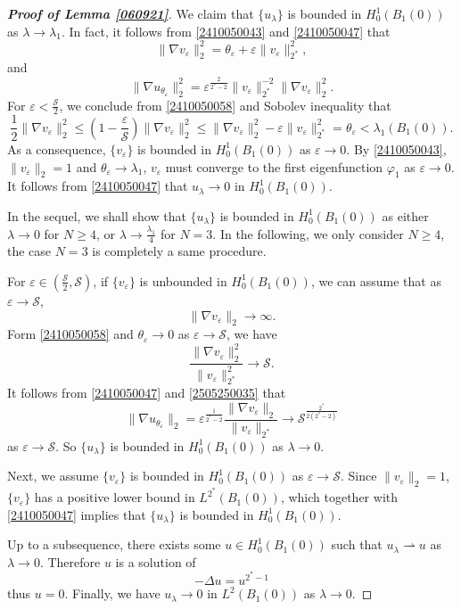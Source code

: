\documentclass[10pt]{article}
\numberwithin{equation}{section}
\numberwithin{equation}{section}
\begin{document}
\begin{proof}[\bf Proof of Lemma \ref{060921}]
 We claim that $\{u_\lambda\}$ is bounded in $H_0^1(B_1(0))$ as $\lambda\to \lambda_1$. In fact, it follows from \eqref{2410050043} and \eqref{2410050047} that
\begin{equation}\label{2410050058}
\|\nabla v_\varepsilon\|_2^2=\theta_\varepsilon +\varepsilon \|v_\varepsilon\|_{2^*}^2,
\end{equation}
and
\[
\|\nabla u_{\theta_\varepsilon}\|_2^2=\varepsilon^{\frac{2}{2^*-2}}\|v_\varepsilon\|^{-2}_{2^*}\|\nabla v_\varepsilon\|_2^2.
\]
For $\varepsilon<\frac{\mathcal{S}}{2}$, we conclude from \eqref{2410050058} and Sobolev inequality that
\[
\frac{1}{2}\|\nabla v_\varepsilon\|_{2}^2\le \left(1-\frac{\varepsilon}{\mathcal{S}}\right)\|\nabla v_\varepsilon\|_{2}^2\le \|\nabla v_\varepsilon\|_2^2-\varepsilon \|v_\varepsilon\|_{2^*}^2= \theta_\varepsilon<\lambda_1(B_1(0)).
\]
As a consequence, $\{v_\varepsilon\}$ is bounded in $H_0^1(B_1(0))$ as $\varepsilon\to 0$. By \eqref{2410050043}, $\|v_\varepsilon\|_2=1$ and $\theta_\varepsilon\to \lambda_1$, $v_\varepsilon$ must converge to the first eigenfunction $\varphi_1$ as $\varepsilon\to 0$. It follows from \eqref{2410050047} that $u_\lambda\to 0$ in $H_0^1(B_1(0))$.
\smallskip

In the sequel, we shall show that $\{u_\lambda\}$ is bounded in $H_0^1(B_1(0))$ as either $\lambda\to 0$ for $N\ge 4$, or $\lambda\to \frac{\lambda_1}{4}$ for $N=3$. In the following, we only consider $N\ge 4$, the case $N=3$ is completely a same procedure.

For $\varepsilon\in (\frac{\mathcal{S}}{2}, \mathcal{S})$, if $\{v_\varepsilon\}$ is unbounded in $H_0^1(B_1(0))$, we can assume that as $\varepsilon\to \mathcal{S}$,
\[
\|\nabla v_\varepsilon\|_2\to\infty.
\]
Form \eqref{2410050058} and $\theta_{\varepsilon}\to 0$ as $\varepsilon\to\mathcal{S}$, we have
\begin{equation}\label{2505250035}
\frac{\|\nabla v_{\varepsilon}\|_2^2}{\|v_{\varepsilon}\|_{2^*}^2}\to \mathcal{S}.
\end{equation}
It follows from \eqref{2410050047} and \eqref{2505250035} that
$$\|\nabla u_{\theta_\varepsilon}\|_2=\varepsilon^{\frac{1}{2^*-2}}\frac{\|\nabla v_{\varepsilon}\|_2}{\|v_{\varepsilon}\|_{2^*}}\to \mathcal{S}^{\frac{2^*}{2(2^*-2)}}$$
 as $\varepsilon\to\mathcal{S}$. So $\{u_\lambda\}$ is bounded in $H_0^1(B_1(0))$ as $\lambda\to 0$.

 \smallskip
 Next, we assume $\{v_\varepsilon\}$ is bounded in $H_0^1(B_1(0))$ as $\varepsilon\to \mathcal{S}$.  Since $\|v_\varepsilon\|_2=1$, $\{v_\varepsilon\}$ has a positive lower bound in $L^{2^*}(B_1(0))$, which together with \eqref{2410050047} implies that $\{u_\lambda\}$ is bounded in $H_0^1(B_1(0))$.

 \smallskip

Up to a subsequence, there exists some $u\in H_0^1(B_1(0))$ such
 that $u_\lambda \rightharpoonup u$ as $\lambda\to 0$. Therefore $u$ is a solution of
 \[
 -\Delta u=u^{2^*-1}
 \]
thus $u=0$. Finally, we have $u_\lambda\to 0$ in $L^2(B_1(0))$ as $\lambda\to 0$.
\end{proof}
\end{document}
